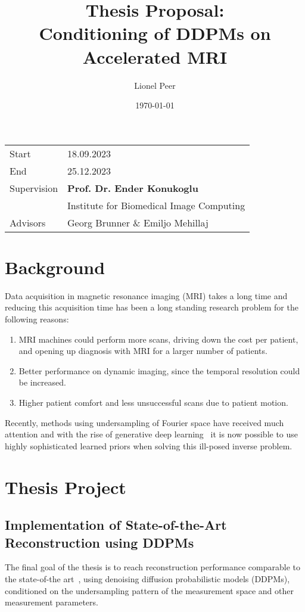 \documentclass[a4paper]{article}
\title{Thesis Proposal:\\Conditioning of DDPMs on Accelerated MRI}
\author{Lionel Peer}
\date{\today}
\begin{document}
\maketitle
\vfill
\begin{tabular}{l l}
    Start       & 18.09.2023                               \\
    End         & 25.12.2023                               \\
    Supervision & \textbf{Prof. Dr. Ender Konukoglu}       \\
                & Institute for Biomedical Image Computing \\
    Advisors    & Georg Brunner \& Emiljo Mehillaj
\end{tabular}
\tableofcontents
\newpage

\section{Background}
Data acquisition in magnetic resonance imaging (MRI) takes a long time and reducing this acquisition time has been a long standing research problem for the following reasons:
\begin{enumerate}
    \item MRI machines could perform more scans, driving down the cost per patient, and opening up diagnosis with MRI for a larger number of patients.
    \item Better performance on dynamic imaging, since the temporal resolution could be increased.
    \item Higher patient comfort and less unsuccessful scans due to patient motion.
\end{enumerate}
Recently, methods using undersampling of Fourier space have received much attention and with the rise of generative deep learning~\cite{kingma2022autoencoding,goodfellow2014generative,ho2020denoising} it is now possible to use highly sophisticated learned priors when solving this ill-posed inverse problem.

\section{Thesis Project}

\subsection{Implementation of State-of-the-Art Reconstruction using DDPMs}
The final goal of the thesis is to reach reconstruction performance comparable to the state-of-the art~\cite{10.1007/978-3-031-16446-0_62}, using denoising diffusion probabilistic models (DDPMs), conditioned on the undersampling pattern of the measurement space and other measurement parameters.
\end{document}
